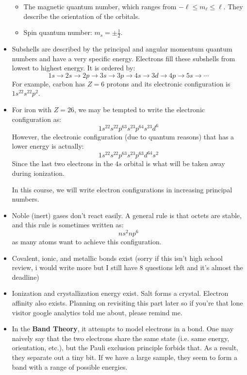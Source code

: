 \begin{itemize}
\begin{itemize}
        \item The magnetic quantum number, which ranges from $-\ell \le m_\ell \le \ell$. They describe the orientation of the orbitals.
        \item Spin quantum number: $m_s = \pm \frac{1}{2}$.
    \end{itemize}
    \item Subshells are described by the principal and angular momentum quantum numbers and have a very specific energy. Electrons fill these subshells from lowest to highest energy. It is ordered by:
    \begin{equation}
        1s \to 2s \to 2p \to 3s \to 3p \to 4s \to 3d \to 4p \to 5s \to \cdots
    \end{equation}
    For example, carbon has $Z=6$ protons and its electronic configuration is $1s^22s^22p^2$.
    \item For iron with $Z=26$, we may be tempted to write the electronic configuration as:
    \begin{equation}
        1s^22s^22p^63s^23p^64s^23d^6
    \end{equation}
    However, the electronic configuration (due to quantum reasons) that has a lower energy is actually:
    \begin{equation}
        1s^22s^22p^63s^23p^63d^64s^2
    \end{equation}
    Since the last two electrons in the $4s$ orbital is what will be taken away during ionization.
    \begin{idea}
        In this course, we will write electron configurations in increasing principal numbers.
    \end{idea}
    \item Noble (inert) gases don't react easily. A general rule is that octets are stable, and this rule is sometimes written as:
    \begin{equation}
        ns^2np^6
    \end{equation}
    as many atoms want to achieve this configuration.
    \item Covalent, ionic, and metallic bonds exist {\tiny{(sorry if this isn't high school review, i would write more but I still have 8 questions left and it's almost the deadline)}}
    \item Ionization and crystallization energy exist. Salt forms a crystal. Electron affinity also exists. Planning on revisiting this part later so if you're that lone visitor google analytics told me about, please remind me.
    \item In the \textbf{Band Theory}, it attempts to model electrons in a bond. One may naively say that the two electrons share the same state (i.e. same energy, orientation, etc.), but the Pauli exclusion principle forbids that. As a result, they separate out a tiny bit. If we have a large sample, they seem to form a band with a range of possible energies.

\end{itemize}
